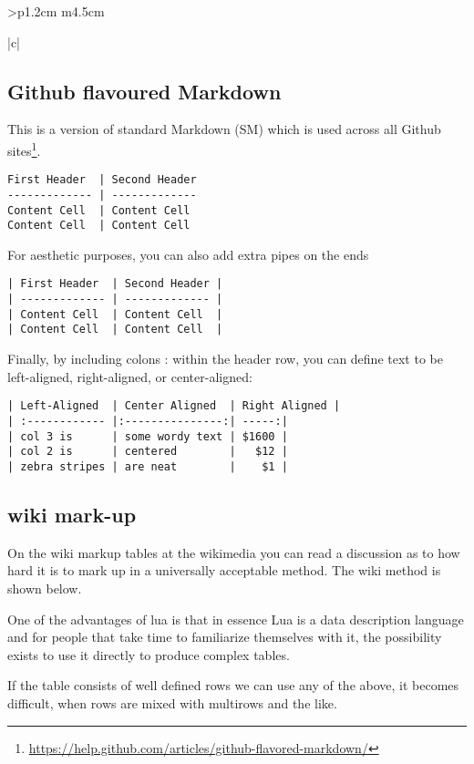 \begin{tabular}{>{\bfseries}p{1.2cm} m{4.5cm}}
\begin{tabular}[t]{|c|}
\begin{longtable}
\subsection{Github flavoured Markdown}

This is a version of standard Markdown (SM) which is used across all Github sites\footnote{ \url{https://help.github.com/articles/github-flavored-markdown/}}. 

\begin{scriptexample}{}{}
\begin{verbatim}
First Header  | Second Header
------------- | -------------
Content Cell  | Content Cell
Content Cell  | Content Cell
\end{verbatim}
\end{scriptexample}

For aesthetic purposes, you can also add extra pipes on the ends

\begin{verbatim}
| First Header  | Second Header |
| ------------- | ------------- |
| Content Cell  | Content Cell  |
| Content Cell  | Content Cell  |
\end{verbatim}

Finally, by including colons : within the header row, you can define text to be left-aligned, right-aligned, or center-aligned:

\begin{verbatim}
| Left-Aligned  | Center Aligned  | Right Aligned |
| :------------ |:---------------:| -----:|
| col 3 is      | some wordy text | $1600 |
| col 2 is      | centered        |   $12 |
| zebra stripes | are neat        |    $1 |
\end{verbatim}


\subsection{wiki mark-up}

On the wiki markup tables at the wikimedia you can read a discussion as to how hard it is to mark up in a 
universally acceptable method. The wiki method is shown below.

One of the advantages of lua is that in essence Lua is a data description language and for people that take time
to familiarize themselves with it, the possibility exists to use it directly to produce complex tables.

If the table consists of well defined rows we can use any of the above, it becomes difficult, when rows are mixed with multirows and the like.


\end{longtable}
\end{tabular}
\end{tabular}
